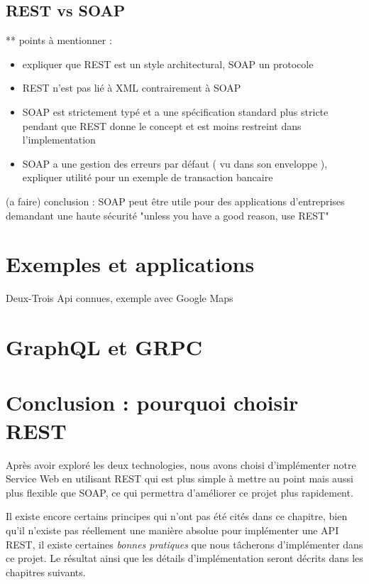 \subsection{REST vs SOAP}
** points à mentionner : 
\begin{itemize}
	\item expliquer que REST est un style architectural, SOAP un protocole
	\item REST n'est pas lié à XML contrairement à SOAP
	\item SOAP est strictement typé et a une spécification standard plus stricte pendant que REST donne le concept et est moins restreint dans l'implementation 
	\item SOAP a une gestion des erreurs par défaut ( vu dans son enveloppe ), expliquer utilité pour un exemple de transaction bancaire
\end{itemize}				 
			
(a faire) conclusion : SOAP peut être utile pour des applications d'entreprises demandant une haute sécurité "unless you have a good reason, use REST" 
\section{Exemples et applications}
Deux-Trois Api connues, exemple avec Google Maps
\section{GraphQL et GRPC}
			
\section{Conclusion : pourquoi choisir REST}
	Après avoir exploré les deux technologies, nous avons choisi d'implémenter notre Service Web en utilisant REST qui est plus simple à mettre au point mais aussi plus flexible que SOAP, ce qui permettra d'améliorer ce projet plus rapidement.
	
	Il existe encore certains principes qui n'ont pas été cités dans ce chapitre, bien qu'il n'existe pas réellement une manière absolue pour implémenter une API REST, il existe certaines \emph{bonnes pratiques} que nous tâcherons d'implémenter dans ce projet. Le résultat ainsi que les détails d'implémentation seront décrits dans les chapitres suivants.
